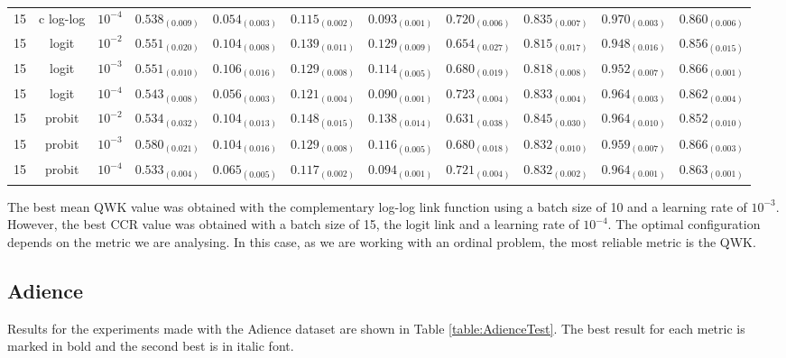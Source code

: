 \documentclass[journal]{IEEEtran}
\begin{document}
\begin{table*}[!t]
\begin{tabular}{c@{\hskip 0.15cm}c@{\hskip 0.15cm}c|c@{\hskip 0.30cm}c@{\hskip 0.20cm}c@{\hskip 0.20cm}c@{\hskip 0.20cm}c@{\hskip 0.20cm}c@{\hskip 0.20cm}c@{\hskip 0.20cm}c}
			15 & c log-log & $10^{-4}$ & $0.538_{(0.009)}$ & $0.054_{(0.003)}$ & $\mathbf{0.115_{(0.002)}}$ & $\mathit{0.093_{(0.001)}}$ & $0.720_{(0.006)}$ & $0.835_{(0.007)}$ & $0.970_{(0.003)}$ & $0.860_{(0.006)}$\\
			15 & logit & $10^{-2}$ & $0.551_{(0.020)}$ & $0.104_{(0.008)}$ & $0.139_{(0.011)}$ & $0.129_{(0.009)}$ & $0.654_{(0.027)}$ & $0.815_{(0.017)}$ & $0.948_{(0.016)}$ & $0.856_{(0.015)}$\\
			15 & logit & $10^{-3}$ & $0.551_{(0.010)}$ & $0.106_{(0.016)}$ & $0.129_{(0.008)}$ & $0.114_{(0.005)}$ & $0.680_{(0.019)}$ & $0.818_{(0.008)}$ & $0.952_{(0.007)}$ & $\mathit{0.866_{(0.001)}}$\\
			15 & logit & $10^{-4}$ & $0.543_{(0.008)}$ & $0.056_{(0.003)}$ & $0.121_{(0.004)}$ & $\mathbf{0.090_{(0.001)}}$ & $\mathbf{0.723_{(0.004)}}$ & $0.833_{(0.004)}$ & $0.964_{(0.003)}$ & $0.862_{(0.004)}$\\
			15 & probit & $10^{-2}$ & $0.534_{(0.032)}$ & $0.104_{(0.013)}$ & $0.148_{(0.015)}$ & $0.138_{(0.014)}$ & $0.631_{(0.038)}$ & $0.845_{(0.030)}$ & $0.964_{(0.010)}$ & $0.852_{(0.010)}$\\
			15 & probit & $10^{-3}$ & $\mathit{0.580_{(0.021)}}$ & $0.104_{(0.016)}$ & $0.129_{(0.008)}$ & $0.116_{(0.005)}$ & $0.680_{(0.018)}$ & $0.832_{(0.010)}$ & $0.959_{(0.007)}$ & $0.866_{(0.003)}$\\
			15 & probit & $10^{-4}$ & $0.533_{(0.004)}$ & $0.065_{(0.005)}$ & $0.117_{(0.002)}$ & $0.094_{(0.001)}$ & $\mathit{0.721_{(0.004)}}$ & $0.832_{(0.002)}$ & $0.964_{(0.001)}$ & $0.863_{(0.001)}$
		\end{tabular}
	\end{table*}
	
	The best mean QWK value was obtained with the complementary log-log link function using a batch size of 10 and a learning rate of $10^{-3}$. However, the best CCR value was obtained with a batch size of 15, the logit link and a learning rate of $10^{-4}$. The optimal configuration depends on the metric we are analysing. In this case, as we are working with an ordinal problem, the most reliable metric is the QWK.
	
	\subsection{Adience}
	\label{sect:adience}
	Results for the experiments made with the Adience dataset are shown in Table \ref{table:AdienceTest}. The best result for each metric is marked in bold and the second best is in italic font.
	
\end{document}
